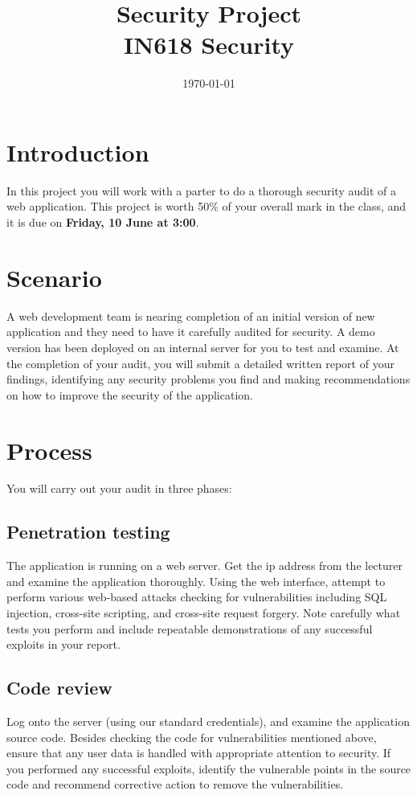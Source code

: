\documentclass{article}
\begin{document}
\title{ Security Project\\ IN618 Security}
\date{\today}
\maketitle

\section*{Introduction}
In this project you will work with a parter to do a thorough security audit of a web application. This project is worth 50\% of your overall mark in the class, and it is due on \textbf{Friday, 10 June at 3:00}.

\section*{Scenario}
A web development team is nearing completion of an initial version of new application and they need to have it carefully audited for security. A demo version has been deployed on an internal server for you to test and examine.  At the completion of your audit, you will submit a detailed written report of your findings, identifying any security problems you find and making recommendations on how to improve the security of the application.

\section*{Process}
You will carry out your audit in three phases:

\subsection*{Penetration testing}
The application is running on a web server. Get the ip address from the lecturer and examine the application thoroughly. Using the web interface, attempt to perform various web-based attacks checking for vulnerabilities including SQL injection, cross-site scripting, and cross-site request forgery. Note carefully what tests you perform and include repeatable demonstrations of any successful exploits in your report.

\subsection*{Code review}
Log onto the server (using our standard credentials), and examine the application source code. Besides checking the code for vulnerabilities mentioned above, ensure that any user data is handled with appropriate attention to security. If you performed any successful exploits, identify the vulnerable points in the source code and recommend corrective action to remove the vulnerabilities.
\end{document}
